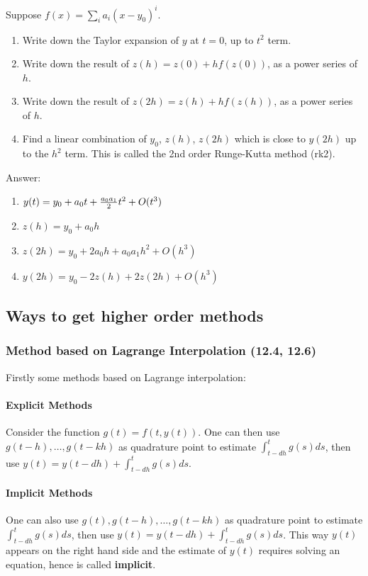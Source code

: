 \documentclass[20pt]{article} %
\theoremstyle{break}
\begin{document}
Suppose $f(x)=\sum_ia_i(x-y_0)^i$.

\begin{enumerate}
\item Write down the Taylor expansion of $y$ at $t=0$, up to $t^2$ term.
\item Write down the result of $z(h)=z(0)+hf(z(0))$, as a power series of $h$.
\item Write down the result of $z(2h)=z(h)+hf(z(h))$, as a power series of $h$.
\item Find a linear combination of $y_0$, $z(h)$, $z(2h)$ which is close to $y(2h)$ up to the $h^2$ term. This is called the 2nd order Runge-Kutta method (rk2).
\end{enumerate}

Answer:

\begin{enumerate}
\item $y(t)=y_0+a_0t+{a_0a_1\over 2}t^2+O(t^3)$
\item $z(h)=y_0+a_0h$
\item $z(2h)=y_0+2a_0h+a_0a_1h^2+O(h^3)$
\item $y(2h)=y_0-2z(h)+2z(2h)+O(h^3)$
\end{enumerate}


\newpage

\subsection{Ways to get higher order methods}

\subsubsection{Method based on Lagrange Interpolation (12.4, 12.6)}

Firstly some methods based on Lagrange interpolation:

\paragraph{Explicit Methods} Consider the function $g(t)=f(t, y(t))$. One can then use $g(t-h), \dots, g(t-kh)$ as quadrature point to estimate $\int_{t-dh}^{t}g(s)ds$, then use $y(t)=y(t-dh)+\int_{t-dh}^{t}g(s)ds$.

\paragraph{Implicit Methods} One can also use $g(t), g(t-h), \dots, g(t-kh)$ as quadrature point to estimate $\int_{t-dh}^{t}g(s)ds$, then use $y(t)=y(t-dh)+\int_{t-dh}^{t}g(s)ds$. This way $y(t)$ appears on the right hand side and the estimate of $y(t)$ requires solving an equation, hence is called {\bf implicit}.
\end{document}
